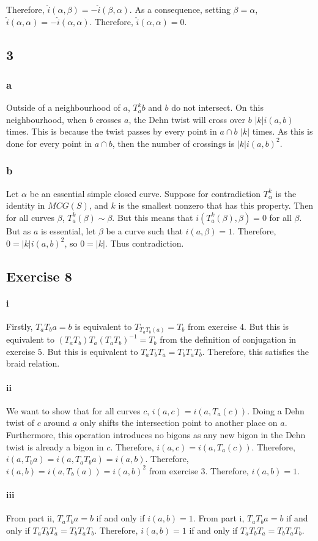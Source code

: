 \documentclass{article}
\theoremstyle{definition}
\numberwithin{theorem}{section}
\numberwithin{equation}{section}
\newcommand*{\inter}{\hat{i}}
\begin{document}
\begin{figure}[ht]
    \centering
    
\end{figure}

Therefore, $\inter(\alpha, \beta) = - \inter(\beta, \alpha)$. 
As a consequence, setting $\beta = \alpha$, $\inter(\alpha, \alpha) = - \inter(\alpha, \alpha)$. Therefore, $\inter(\alpha, \alpha) = 0$. 
\subsection{3}
\subsubsection{a}
Outside of a neighbourhood of $a$, $T_a^k b$ and $b$ do not intersect. On this neighbourhood, when $b$ crosses $a$, the Dehn twist will cross over $b$ $|k| i(a, b)$ times. This is because the twist passes by every point in $a \cap b$ $|k|$ times. As this is done for every point in $a \cap b$, then the number of crossings is $|k| i(a, b)^2$. 

\subsubsection{b}
Let $\alpha$ be an essential simple closed curve. Suppose for contradiction $T^k_\alpha$ is the identity in $MCG(S)$, and $k$ is the smallest nonzero that has this property. Then for all curves $\beta$, $T_a^k(\beta) \sim \beta$. But this means that $i(T^k_a(\beta), \beta) = 0$ for all $\beta$. But as $a$ is essential, let $\beta$ be a curve such that $i(a, \beta) = 1$. Therefore, $0 = |k| i(a, b)^2$, so $0 = |k|$. Thus contradiction. 
\subsection{Exercise 8}

\paragraph*{i}
Firstly, $T_a T_b a = b$ is equivalent to $T_{T_a T_b(a)} = T_b$ from exercise 4. But this is equivalent to $(T_a T_b) T_a (T_a T_b)^{-1} = T_b$ from the definition of conjugation in exercise $5$. But this is equivalent to $T_a T_b T_a = T_b T_a T_b$. Therefore, this satisfies the braid relation. 

\paragraph*{ii}
We want to show that for all curves $c$, $i(a, c) = i(a, T_a(c))$. Doing a Dehn twist of $c$ around $a$ only shifts the intersection point to another place on $a$. Furthermore, this operation introduces no bigons as any new bigon in the Dehn twist is already a bigon in $c$. Therefore, $i(a, c) = i(a, T_a(c))$. Therefore, $i(a, T_b a) = i(a, T_a T_b a) = i(a, b)$. 
Therefore, $i (a, b) = i(a, T_b(a)) = i(a, b)^2$ from exercise 3. Therefore, $i(a, b) = 1$.
\paragraph*{iii}
From part ii, $T_a T_b a = b$ if and only if $i(a, b) = 1$. From part i, $T_a T_b a = b$ if and only if $T_a T_b T_a = T_b T_a T_b$. Therefore, $i(a, b) = 1$ if and only if $T_a T_b T_a = T_b T_a T_b$.
\end{document}
